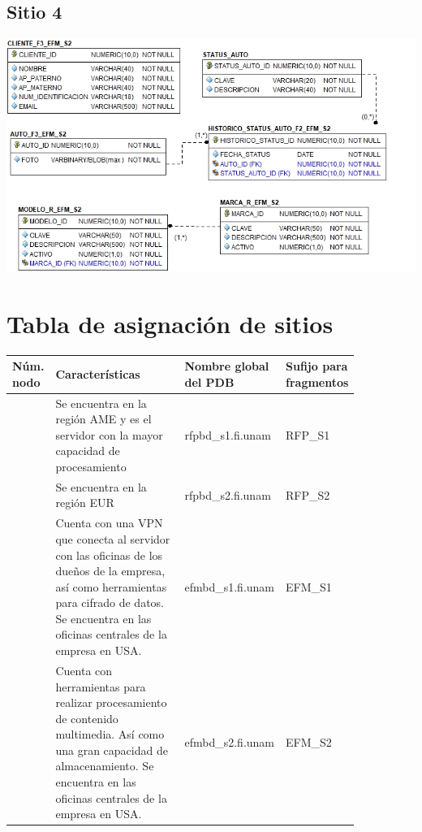 \documentclass{article}
\begin{document}
\subsection*{Sitio 4}
\includegraphics[width=0.8\linewidth]{modelo-n4}

\section*{Tabla de asignación de sitios}

\newcommand{\nameTabBuilder}[1]{F\_RFP\_#1}
\newcommand{\snI}{RFP\_S1}
\newcommand{\snII}{RFP\_S2}
\newcommand{\snIII}{EFM\_S1}
\newcommand{\snIV}{EFM\_S2}
\newcommand{\pdbI}{rfpbd\_s1.fi.unam}
\newcommand{\pdbII}{rfpbd\_s2.fi.unam}
\newcommand{\pdbIII}{efmbd\_s1.fi.unam}
\newcommand{\pdbIV}{efmbd\_s2.fi.unam}

{
  \setlength\tabcolsep{3.5mm}
  \def\arraystretch{2}          %
  \begin{longtable}{
    |C{0.05\linewidth}
    |p{0.5\linewidth}
    |C{0.2\linewidth}
    |p{0.1\linewidth}|}
  \hline
  \textbf{Núm. nodo} &
  \textbf{Características} & 
  \textbf{Nombre global del PDB} & 
  \parbox[t]{2cm}{\centering \textbf{Sufijo para fragmentos}} 
  \\ \hline
    &
  Se encuentra en la región AME y es el servidor con la mayor capacidad 
  de procesamiento & 
 \pdbI & 
  \snI 
  \\ \hline
    &
  Se encuentra en la región EUR & 
  \pdbII & 
  \snII
  \\ \hline
    &
  Cuenta con una VPN que conecta al servidor con las oficinas de los dueños de 
  la empresa, así como herramientas para cifrado de datos. Se encuentra en las 
  oficinas centrales de la empresa en USA. & 
  \pdbIII & 
  \snIII
  \\ \hline
    &
  Cuenta con herramientas para realizar procesamiento de contenido multimedia. 
  Así como una gran capacidad de almacenamiento. Se encuentra en las oficinas 
  centrales de la empresa en USA. & 
  \pdbIV & 
  \snIV
  \\ \hline
  \end{longtable}
}
\end{document}
